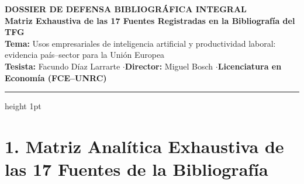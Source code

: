 \documentclass[10pt,a4paper,landscape]{article}
\begin{document}
\begin{center}
  {\Large\bfseries\color{ForestDark} DOSSIER DE DEFENSA BIBLIOGRÁFICA INTEGRAL}\\[0.12cm]
  {\large\bfseries\color{Gold} Matriz Exhaustiva de las 17 Fuentes Registradas en la Bibliografía del TFG}\\[0.18cm]
  \textbf{Tema:} Usos empresariales de inteligencia artificial y productividad laboral: evidencia país--sector para la Unión Europea\\[0.06cm]
  \textbf{Tesista:} Facundo Díaz Larrarte \quad$\cdot$\quad \textbf{Director:} Miguel Bosch \quad$\cdot$\quad \textbf{Licenciatura en Economía (FCE--UNRC)}
\end{center}

\vspace{0.15cm}
\hrule height 1pt
\vspace{0.35cm}

\section*{1. Matriz Analítica Exhaustiva de las 17 Fuentes de la Bibliografía}
\end{document}
